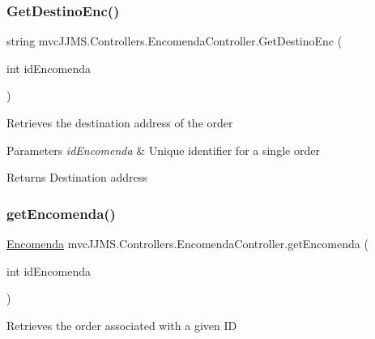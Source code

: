 \subsubsection{\texorpdfstring{Get\+Destino\+Enc()}{GetDestinoEnc()}}
{\footnotesize\ttfamily string mvc\+J\+J\+M\+S.\+Controllers.\+Encomenda\+Controller.\+Get\+Destino\+Enc (\begin{DoxyParamCaption}\item[{int}]{id\+Encomenda }\end{DoxyParamCaption})\hspace{0.3cm}{\ttfamily [inline]}}



Retrieves the destination address of the order 


\begin{DoxyParams}{Parameters}
{\em id\+Encomenda} & Unique identifier for a single order\\
\hline
\end{DoxyParams}
\begin{DoxyReturn}{Returns}
Destination address
\end{DoxyReturn}
\mbox{\label{classmvc_j_j_m_s_1_1_controllers_1_1_encomenda_controller_adbeb0c2e410bf9d8706de7b75daf05eb}} 
\subsubsection{\texorpdfstring{get\+Encomenda()}{getEncomenda()}}
{\footnotesize\ttfamily \mbox{\hyperlink{classmvc_j_j_m_s_1_1_models_1_1_encomenda}{Encomenda}} mvc\+J\+J\+M\+S.\+Controllers.\+Encomenda\+Controller.\+get\+Encomenda (\begin{DoxyParamCaption}\item[{int}]{id\+Encomenda }\end{DoxyParamCaption})\hspace{0.3cm}{\ttfamily [inline]}}



Retrieves the order associated with a given ID 


